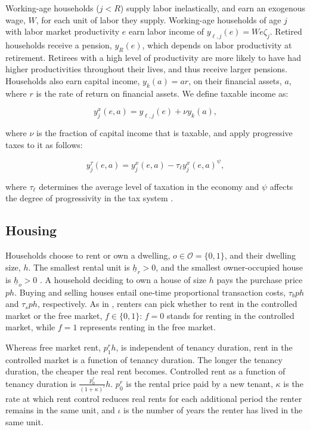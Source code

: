 \documentclass[parskip=full]{article}
\begin{document}
Working-age households ($j<R$) supply labor inelastically, and earn an exogenous wage, $W$, for each unit of labor they supply. Working-age households of age $j$ with labor market productivity $e$ earn labor income of $y_{\ell,j}(e)=We\zeta_j$. Retired households receive a pension, $y_{R}(e)$, which depends on labor productivity at retirement. Retirees with a high level of productivity are more likely to have had higher productivities throughout their lives, and thus receive larger pensions. Households also earn capital income, $y_{k}(a)=ar$, on their financial assets, $a$, where $r$ is the rate of return on financial assets. We define taxable income as:

\begin{equation*}\label{eq:taxable_labor_income}
  y^{x}_{j}(e,a) =y_{\ell,j}(e)+\nu y_{k}(a),
\end{equation*}

\noindent where $\nu$ is the fraction of capital income that is taxable, and apply progressive taxes to it as follows:

\begin{equation}\label{eq:income_tax}
  y^{\tau}_{j}(e,a) = y^{x}_{j}(e,a)-\tau_{\ell}y^{x}_{j}(e,a)^{\psi},
\end{equation}

\noindent where $\tau_{\ell}$ determines the average level of taxation in the economy and $\psi$ affects the degree of progressivity in the tax system \citep{hsv-2020}.

\subsection{Housing}\label{subsection:housing_choice}

Households choose to rent or own a dwelling, $o \in \mathcal{O}=\{0,1\}$, and their dwelling size, $h$. The smallest rental unit is $\underline{h}_{r}>0$, and the smallest owner-occupied house is $\underline{h}_{o}>0$ \citep{gervais,sommeretal-2013,sommersullivan-2017,kaplanetal-2019}. A household deciding to own a house of size $h$ pays the purchase price $p h$. Buying and selling houses entail one-time proportional transaction costs, $\tau_{b} p h$ and $\tau_{s} p h$, respectively. As in \citet{fallis-1985}, renters can pick whether to rent in the controlled market or the free market, $f \in \{0,1\}$: $f=0$ stands for renting in the controlled market, while $f=1$ represents renting in the free market. 

Whereas free market rent, $p^{r}_{1}h$, is independent of tenancy duration, rent in the controlled market is a function of tenancy duration. The longer the tenancy duration, the cheaper the real rent becomes. Controlled rent as a function of tenancy duration is $\frac{p^{r}_{0}}{(1+\kappa)^{\iota}} h$. $p^{r}_{0}$ is the rental price paid by a new tenant, $\kappa$ is the rate at which rent control reduces real rents for each additional period the renter remains in the same unit, and $\iota$ is the number of years the renter has lived in the same unit. 
\end{document}
